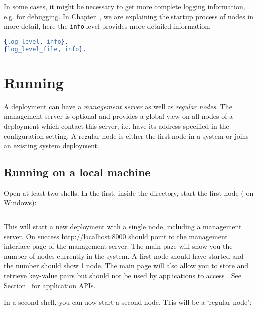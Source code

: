 In some cases, it might be necessary to get more complete logging
information, e.g. for debugging. In Chapter~,
we are explaining the startup process of \scalaris{} nodes in more
detail, here the {\tt info} level provides more detailed information.

\begin{lstlisting}[language=erlang]
%% @doc Loglevel: debug < info < warn < error < fatal < none
{log_level, info}.
{log_level_file, info}.
\end{lstlisting}


\section{Running \scalaris{}}


A \scalaris{} deployment can have a \emph{management server} as well as
\emph{regular nodes}. The
management server is optional and provides a global view on all nodes of a
\scalaris{} deployment which contact this server, i.e. have its address
specified in the  configuration setting.
A regular node is either the first node in a system or joins an
existing system deployment.

\subsection{Running on a local machine}
\label{sec.boot}

Open at least two shells. In the first, inside the \scalaris{} directory,
start the first node ( on Windows):
\begin{lstlisting}[language=sh]
%> ./bin/firstnode.sh
\end{lstlisting}

This will start a new \scalaris{} deployment with a single node, including a
management server. On success \url{http://localhost:8000} should point to
the management interface page of the management server. The main page will
show you the number of nodes currently in the system.
A first \scalaris{} node should have started and the number should
show 1 node. The main page will also allow you to store and retrieve
key-value pairs but should not be used by applications to access
\scalaris{}. See Section~ for application APIs.

In a second shell, you can now start a second \scalaris{} node. This
will be a `regular node':
\begin{lstlisting}[language=sh]
%> ./bin/joining_node.sh
\end{lstlisting}

